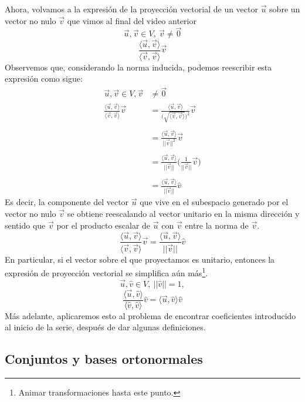 \documentclass[12pt,dvipsnames]{article}
\numberwithin{equation}{section}
\begin{document}
Ahora, volvamos a la expresión de la proyección vectorial de un vector $\vec{u}$ sobre un vector no nulo $\vec{v}$ que vimos al final del video anterior
\[
\vec{u},\vec{v}\in V, \ \vec{v}\neq \vec{0}
\] 
\[
\frac{\langle \vec{u} , \vec{v} \rangle}{\langle \vec{v} , \vec{v} \rangle} \vec{v} 
\] 
Observemos que, considerando la norma inducida, podemos reescribir esta expresión como sigue:
\begin{align*}
    \vec{u},\vec{v}\in V, \vec{v}&\neq \vec{0} \\
    \frac{\langle \vec{u} , \vec{v} \rangle}{\langle \vec{v} , \vec{v} \rangle} \vec{v} &= \frac{\langle \vec{u} , \vec{v} \rangle}{\big(\sqrt{\langle \vec{v} , \vec{v} \rangle}\big)^2} \vec{v} \\ \\
                                                                                        &= \frac{\langle \vec{u} , \vec{v} \rangle}{||\vec{v}||^2} \vec{v} \\ \\
                                                                                        &= \frac{\langle \vec{u} , \vec{v} \rangle}{||\vec{v}||} \bigg( \frac{1}{||\vec{v}||} \vec{v} \bigg) \\ \\
                                                                                        &= \frac{\langle \vec{u} , \vec{v} \rangle}{||\vec{v}||} \hat{v}
\end{align*}
Es decir, la componente del vector $\vec{u}$ que vive en el subespacio generado por el vector no nulo $\vec{v}$ se obtiene reescalando al vector unitario en la misma dirección y sentido que $\vec{v}$ por el producto escalar de $\vec{u}$ con $\vec{v}$ entre la norma de $\vec{v}$.
\[
    \frac{\langle \vec{u} , \vec{v} \rangle}{\langle \vec{v} , \vec{v} \rangle} \vec{v} = \frac{\langle \vec{u} , \vec{v} \rangle}{||\vec{v}||} \hat{v}
\] 
En particular, si el vector sobre el que proyectamos es unitario, entonces la expresión de proyección vectorial se simplifica aún más\footnote{Animar transformaciones hasta este punto.}.
\[
\vec{u},\hat{v}\in V, \ ||\hat{v}||=1,
\] 
\[
    \frac{\langle \vec{u} , \hat{v} \rangle}{\langle \hat{v} , \hat{v} \rangle} \hat{v} = \langle \vec{u} , \hat{v} \rangle \hat{v}
\] 
Más adelante, aplicaremos esto al problema de encontrar coeficientes introducido al inicio de la serie, después de dar algunas definiciones.

\subsection{Conjuntos y bases ortonormales}
\end{document}
